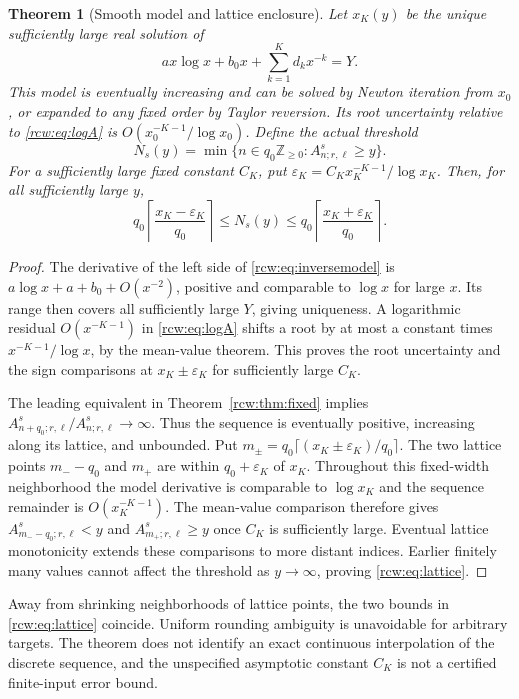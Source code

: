 \documentclass[11pt]{article}
\newtheorem{theorem}{Theorem}[section]
\theoremstyle{definition}\newtheorem{definition}[theorem]{Definition}
\theoremstyle{remark}\newtheorem{remark}[theorem]{Remark}
\newcommand{\eps}{\varepsilon}
\numberwithin{equation}{section}
\begin{document}
\begin{theorem}[Smooth model and lattice enclosure]\label{rcw:thm:inverse}
Let $x_K(y)$ be the unique sufficiently large real solution of
\begin{equation}\label{rcw:eq:inversemodel}
 a x\log x+b_0x+\sum_{k=1}^K d_kx^{-k}=Y.
\end{equation}
This model is eventually increasing and can be solved by Newton iteration from $x_0$, or expanded to any fixed order by Taylor reversion. Its root uncertainty relative to \eqref{rcw:eq:logA} is $O(x_0^{-K-1}/\log x_0)$. Define the actual threshold
\[
 N_s(y)=\min\{n\in q_0\mathbb Z_{\ge0}:A^s_{n;r,\ell}\ge y\}.
\]
For a sufficiently large fixed constant $C_K$, put
$\eps_K=C_Kx_K^{-K-1}/\log x_K$. Then, for all sufficiently large $y$,
\begin{equation}\label{rcw:eq:lattice}
 q_0\left\lceil\frac{x_K-\eps_K}{q_0}\right\rceil
 \le N_s(y)\le
 q_0\left\lceil\frac{x_K+\eps_K}{q_0}\right\rceil.
\end{equation}
\end{theorem}
\begin{proof}
The derivative of the left side of \eqref{rcw:eq:inversemodel} is $a\log x+a+b_0+O(x^{-2})$, positive and comparable to $\log x$ for large $x$. Its range then covers all sufficiently large $Y$, giving uniqueness. A logarithmic residual $O(x^{-K-1})$ in \eqref{rcw:eq:logA} shifts a root by at most a constant times $x^{-K-1}/\log x$, by the mean-value theorem. This proves the root uncertainty and the sign comparisons at $x_K\pm\eps_K$ for sufficiently large $C_K$.

The leading equivalent in Theorem~\ref{rcw:thm:fixed} implies
$A^s_{n+q_0;r,\ell}/A^s_{n;r,\ell}\to\infty$. Thus the sequence is eventually positive, increasing along its lattice, and unbounded. Put $m_\pm=q_0\lceil(x_K\pm\eps_K)/q_0\rceil$. The two lattice points $m_- -q_0$ and $m_+$ are within $q_0+\eps_K$ of $x_K$. Throughout this fixed-width neighborhood the model derivative is comparable to $\log x_K$ and the sequence remainder is $O(x_K^{-K-1})$. The mean-value comparison therefore gives $A^s_{m_- -q_0;r,\ell}<y$ and $A^s_{m_+;r,\ell}\ge y$ once $C_K$ is sufficiently large. Eventual lattice monotonicity extends these comparisons to more distant indices. Earlier finitely many values cannot affect the threshold as $y\to\infty$, proving \eqref{rcw:eq:lattice}.
\end{proof}
Away from shrinking neighborhoods of lattice points, the two bounds in \eqref{rcw:eq:lattice} coincide. Uniform rounding ambiguity is unavoidable for arbitrary targets. The theorem does not identify an exact continuous interpolation of the discrete sequence, and the unspecified asymptotic constant $C_K$ is not a certified finite-input error bound.
\end{document}
